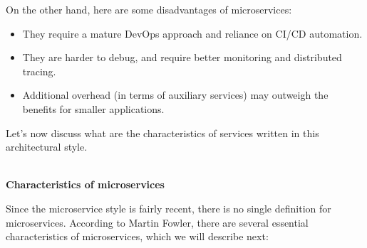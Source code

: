 On the other hand, here are some disadvantages of microservices:

\begin{itemize}
\item	
They require a mature DevOps approach and reliance on CI/CD automation.

\item
They are harder to debug, and require better monitoring and distributed tracing.

\item
Additional overhead (in terms of auxiliary services) may outweigh the benefits for smaller applications.

\end{itemize}

Let's now discuss what are the characteristics of services written in this architectural style.

\hspace*{\fill} \\ %
\noindent
\textbf{Characteristics of microservices}

Since the microservice style is fairly recent, there is no single definition for microservices. According to Martin Fowler, there are several essential characteristics of microservices, which we will describe next:

